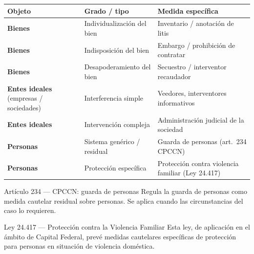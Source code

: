 \documentclass[12pt,oneside]{book}
\begin{document}
\begin{table}[H]
\centering
\small
\begin{tabularx}{\textwidth}{>{\raggedright\arraybackslash}p{} Y Y}
\toprule
\textbf{Objeto} & \textbf{Grado / tipo} & \textbf{Medida específica} \\
\midrule
\textbf{Bienes} & Individualización del bien & Inventario / anotación de litis \\
\textbf{Bienes} & Indisposición del bien & Embargo / prohibición de contratar \\
\textbf{Bienes} & Desapoderamiento del bien & Secuestro / interventor recaudador \\
\textbf{Entes ideales} (empresas / sociedades) & Interferencia simple & Veedores, interventores informativos \\
\textbf{Entes ideales} & Intervención compleja & Administración judicial de la sociedad \\
\textbf{Personas} & Sistema genérico / residual & Guarda de personas (art.~234 CPCCN) \\
\textbf{Personas} & Protección específica & Protección contra violencia familiar (Ley 24.417) \\
\bottomrule
\end{tabularx}
\end{table}

\begin{normativa}{Artículo 234 --- CPCCN: guarda de personas}
Regula la guarda de personas como medida cautelar residual sobre personas. Se aplica cuando las circunstancias del caso lo requieren.
\end{normativa}

\begin{normativa}{Ley 24.417 --- Protección contra la Violencia Familiar}
Esta ley, de aplicación en el ámbito de Capital Federal, prevé medidas cautelares específicas de protección para personas en situación de violencia doméstica.
\end{normativa}
\end{document}
